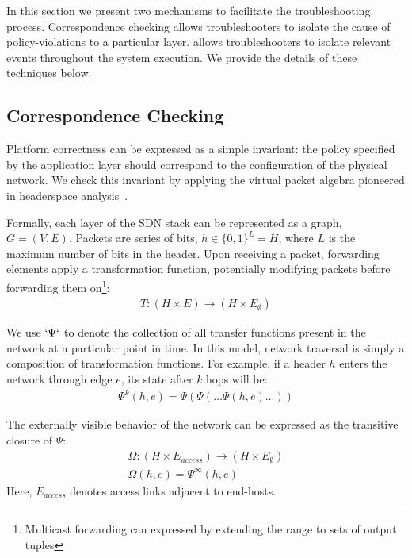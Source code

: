 In this section we present two mechanisms to facilitate the troubleshooting
process. Correspondence checking allows troubleshooters to isolate
the cause of policy-violations to a particular layer. \Simulator{}
allows troubleshooters to isolate relevant events throughout the system
execution. We provide the details of these techniques below. 


\subsection{Correspondence Checking}

Platform correctness can be expressed as a simple invariant:
the policy specified by the application layer should correspond to the
configuration of the
physical network. We check this invariant by applying the virtual packet
algebra pioneered in headerspace analysis~\cite{hsa}. 

Formally, each layer of the SDN stack can be represented as a graph,
$G = (V, E)$. Packets are series of bits, $h \in \{0,1\}^L = H$,
where $L$ is the maximum number of bits in the header. Upon receiving a packet,
forwarding elements apply a transformation function, potentially modifying
packets before forwarding them on\footnote{Multicast forwarding can expressed
by extending the range to sets of output tuples}:
\begin{align*}
T: (H \times E) \rightarrow (H \times E_{\emptyset})
\end{align*}

We use $`\Psi`$ to denote the collection of all transfer functions present in
the network at a particular point in time. In this model, network traversal is simply a composition of transformation
functions. For example, if a header $h$ enters the network through edge
$e$, its state after $k$ hops will be:
\begin{align*}
\Psi^k(h,e) = \Psi(\Psi(\dots \Psi(h,e)\dots))
\end{align*}

The externally visible behavior of the network can be expressed as the
transitive closure of $\Psi$:
\begin{align*}
\Omega: (H \times E_{access}) \rightarrow (H \times E_{\emptyset}) \\
\Omega(h,e) = \Psi^{\infty}(h,e)
\end{align*}
Here, $E_{access}$ denotes access links adjacent to end-hosts.

